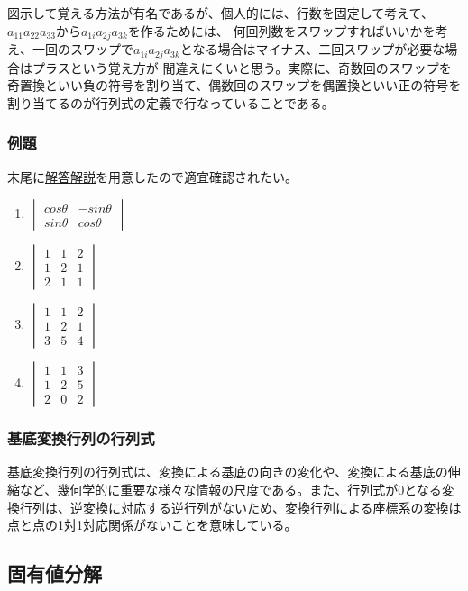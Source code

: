 \documentclass[10pt]{ujarticle}
\begin{document}
図示して覚える方法が有名であるが、個人的には、行数を固定して考えて、$a_{11}a_{22}a_{33}$から$a_{1i}a_{2j}a_{3k}$を作るためには、
何回列数をスワップすればいいかを考え、一回のスワップで$a_{1i}a_{2j}a_{3k}$となる場合はマイナス、二回スワップが必要な場合はプラスという覚え方が
間違えにくいと思う。実際に、奇数回のスワップを奇置換といい負の符号を割り当て、偶数回のスワップを偶置換といい正の符号を割り当てるのが行列式の定義で行なっていることである。

\subsubsection{例題}
末尾に\hyperlink{q1}{解答解説}を用意したので適宜確認されたい。
\begin{enumerate}
  \item $\begin{vmatrix} cos\theta & -sin\theta\\ sin\theta & cos\theta \end{vmatrix}$
  \item $\begin{vmatrix} 1 & 1 & 2 \\ 1 & 2 & 1 \\ 2 & 1 & 1 \end{vmatrix}$
  \item $\begin{vmatrix} 1 & 1 & 2 \\ 1 & 2 & 1 \\ 3 & 5 & 4 \end{vmatrix}$
  \item $\begin{vmatrix} 1 & 1 & 3 \\ 1 & 2 & 5 \\ 2 & 0 & 2 \end{vmatrix}$
\end{enumerate}
\subsubsection{基底変換行列の行列式}
基底変換行列の行列式は、変換による基底の向きの変化や、変換による基底の伸縮など、幾何学的に重要な様々な情報の尺度である。また、行列式が0となる変換行列は、逆変換に対応する逆行列がないため、変換行列による座標系の変換は点と点の1対1対応関係がないことを意味している。

\hypertarget{eigen}{\subsection{固有値分解}}
\end{document}
